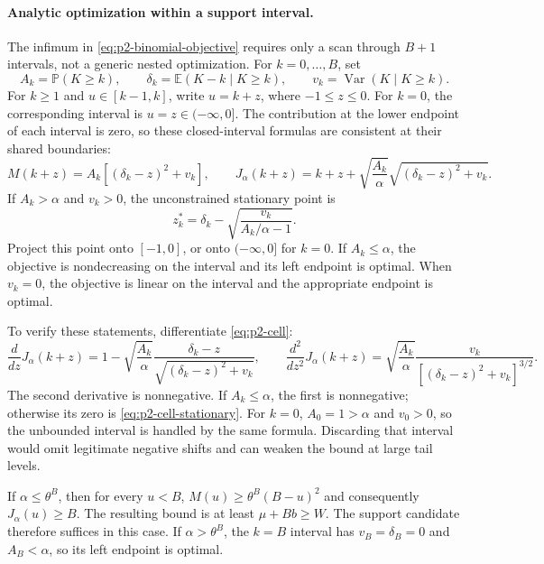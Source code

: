 \documentclass[11pt,letterpaper]{article}
\numberwithin{equation}{section}
\theoremstyle{definition}
\theoremstyle{remark}
\begin{document}
\paragraph{Analytic optimization within a support interval.}
The infimum in \eqref{eq:p2-binomial-objective} requires only a scan through
$B+1$ intervals, not a generic nested optimization. For $k=0,\ldots,B$, set
\[
  A_k=\mathbb{P}(K\ge k),\qquad
  \delta_k=\mathbb{E}(K-k\mid K\ge k),\qquad
  v_k=\operatorname{Var}(K\mid K\ge k).
\]
For $k\ge1$ and $u\in[k-1,k]$, write $u=k+z$, where $-1\le z\le0$.
For $k=0$, the corresponding interval is $u=z\in(-\infty,0]$.
The contribution at the lower endpoint of each interval is zero, so these
closed-interval formulas are consistent at their shared boundaries:
\begin{equation}
  M(k+z)=A_k[(\delta_k-z)^2+v_k],\qquad
  J_\alpha(k+z)=k+z+
    \sqrt{\frac{A_k}{\alpha}}
    \sqrt{(\delta_k-z)^2+v_k}.
  \label{eq:p2-cell}
\end{equation}
If $A_k>\alpha$ and $v_k>0$, the unconstrained stationary point is
\begin{equation}
  z_k^*=\delta_k-\sqrt{\frac{v_k}{A_k/\alpha-1}}.
  \label{eq:p2-cell-stationary}
\end{equation}
Project this point onto $[-1,0]$, or onto $(-\infty,0]$ for $k=0$.
If $A_k\le\alpha$, the objective is nondecreasing on the interval and its
left endpoint is optimal. When $v_k=0$, the objective is linear on the
interval and the appropriate endpoint is optimal.

To verify these statements, differentiate \eqref{eq:p2-cell}:
\[
  \frac{d}{dz}J_\alpha(k+z)
   =1-\sqrt{\frac{A_k}{\alpha}}
      \frac{\delta_k-z}{\sqrt{(\delta_k-z)^2+v_k}},
  \qquad
  \frac{d^2}{dz^2}J_\alpha(k+z)
   =\sqrt{\frac{A_k}{\alpha}}
      \frac{v_k}{[(\delta_k-z)^2+v_k]^{3/2}}.
\]
The second derivative is nonnegative. If $A_k\le\alpha$, the first is
nonnegative; otherwise its zero is \eqref{eq:p2-cell-stationary}.
For $k=0$, $A_0=1>\alpha$ and $v_0>0$, so the unbounded interval is
handled by the same formula. Discarding that interval would omit legitimate
negative shifts and can weaken the bound at large tail levels.

If $\alpha\le\theta^B$, then for every $u<B$,
$M(u)\ge\theta^B(B-u)^2$ and consequently $J_\alpha(u)\ge B$.
The resulting bound is at least $\mu+Bb\ge W$. The support candidate
therefore suffices in this case. If $\alpha>\theta^B$, the $k=B$ interval
has $v_B=\delta_B=0$ and $A_B<\alpha$, so its left endpoint is optimal.
\end{document}
